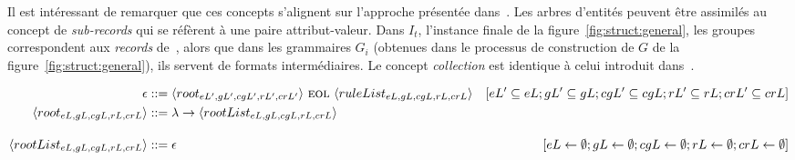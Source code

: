 Il est intéressant de remarquer que ces concepts s'alignent sur l'approche présentée dans~\cite{barretGenericAbstractionsData2021}.
Les arbres d'entités peuvent être assimilés au concept de \emph{sub-records} qui se réfèrent à une paire attribut-valeur.
Dans $I_t$, l'instance finale de la figure~\ref{fig:struct:general}, les groupes correspondent aux \emph{records} de~\cite{barretGenericAbstractionsData2021}, alors que dans les grammaires $G_i$ (obtenues dans le processus de construction de $G$ de la figure~\ref{fig:struct:general}), ils servent de formats intermédiaires.
Le concept \textit{collection} est identique à celui introduit dans~\cite{barretGenericAbstractionsData2021}.

\begin{landscape}
    \centering
    \begin{adjustbox}{max width=\linewidth,max height=.95\textheight,valign=c}
        \parbox{\linewidth}{\begin{align}
                \epsilon                                    & ::= \langle root_{eL',gL',cgL',rL',crL'} \rangle ~\textsc{eol}~ \langle ruleList_{eL,gL,cgL,rL,crL} \rangle                                                                                                                                                                                                                                                                                  & [eL' \subseteq eL; gL' \subseteq gL; cgL' \subseteq cgL; rL' \subseteq rL; crL' \subseteq crL]                    \label{meta:start}      \\
                \langle root_{eL,gL,cgL,rL,crL} \rangle     & ::= \lambda \to \langle rootList_{eL,gL,cgL,rL,crL} \rangle                                                                                                                                                                                                                                                                                                           \label{meta:root}                                                                                                                                                  \\[1em]
                \langle rootList_{eL,gL,cgL,rL,crL} \rangle & ::= \epsilon                                                                                                                                                                                                                                                                                                                                                                                 & [eL \gets \emptyset; gL \gets \emptyset; cgL \gets \emptyset; rL \gets \emptyset; crL \gets \emptyset]            \label{meta:rootList:1} \\

\end{align}}
\end{adjustbox}
\end{landscape}
